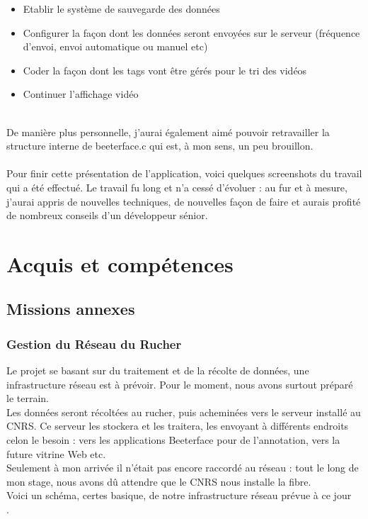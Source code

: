 \documentclass[11pt,french,a4paper]{report}
\begin{document}
\begin{itemize}
    \item Etablir le système de sauvegarde des données
    \item Configurer la façon dont les données seront envoyées sur le serveur (fréquence d'envoi, envoi automatique ou manuel etc) 
    \item Coder la façon dont les tags vont être  gérés pour le tri des vidéos 
    \item Continuer l'affichage vidéo
\end{itemize} 
\\
De manière plus personnelle, j'aurai également aimé pouvoir retravailler la structure interne de beeterface.c qui est, à mon sens,
un peu brouillon. \\
\\
Pour finir cette présentation de l'application, voici quelques screenshots du travail qui a été effectué.
Le travail fu long et n'a cessé d'évoluer : au fur et à mesure, j'aurai appris de nouvelles techniques, de nouvelles façon de faire 
et aurais profité de nombreux conseils d'un développeur sénior. \\


\chapter{Acquis et compétences}
    \section{Missions annexes}
        \subsection{Gestion du Réseau du Rucher}
Le projet se basant sur du traitement et de la récolte de données, une infrastructure réseau est à prévoir. Pour le moment,
nous avons surtout préparé le terrain.  \\
Les données seront récoltées au rucher, puis acheminées vers le serveur installé au CNRS. Ce serveur les stockera et les traitera, 
les envoyant à différents endroits celon le besoin : vers les applications Beeterface pour de l'annotation, vers la future vitrine Web
etc. \\
Seulement à mon arrivée il n'était pas encore raccordé au réseau : tout le long de mon stage,  nous avons dû attendre que
le CNRS nous installe la fibre. \\

Voici un schéma, certes basique, de notre infrastructure réseau prévue à ce jour \\.
\end{document}
